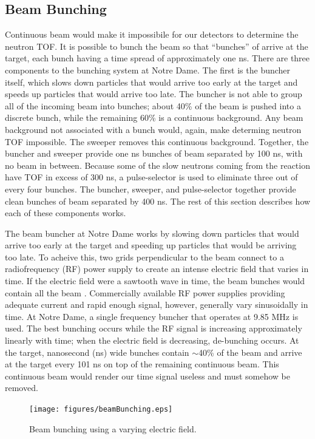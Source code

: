 \subsection{Beam Bunching}

Continuous beam would make it impossibile for our detectors to determine the neutron TOF.  It is possible to bunch the beam so that ``bunches'' of  arrive at the target, each bunch having a time spread of approximately one ns. There are three components to the bunching system at Notre Dame.  The first is the buncher itself, which slows down particles that would arrive too early at the target and speeds up particles that would arrive too late.  The buncher is not able to group all of the incoming beam into bunches; about 40\% of the beam is pushed into a discrete bunch, while the remaining 60\% is a continuous background.  Any beam background not associated with a bunch would, again, make determing neutron TOF impossible.  The sweeper removes this continuous background.  Together, the buncher and sweeper provide one ns bunches of beam separated by 100 ns, with no beam in between.  Because some of the slow neutrons coming from the reaction have TOF in excess of 300 ns, a pulse-selector is used to eliminate three out of every four bunches.  The buncher, sweeper, and pulse-selector together provide clean bunches of beam separated by 400 ns.  The rest of this section describes how each of these components works.

The beam buncher at Notre Dame works by slowing down particles that would arrive too early at the target and speeding up particles that would be arriving too late.  To acheive this, two grids perpendicular to the beam connect to a radiofrequency (RF) power supply to create an intense electric field that varies in time.  If the electric field were a sawtooth wave in time, the beam bunches would contain all the beam \cite{LynchBunching}.  Commercially available RF power supplies providing adequate current and rapid enough signal, however, generally vary sinusoidally in time.  At Notre Dame, a single frequency buncher that operates at 9.85 MHz is used.  The best bunching occurs while the RF signal is increasing approximately linearly with time; when the electric field is decreasing, de-bunching occurs.  At the target, nanosecond (ns) wide bunches contain $\sim$40\% of the beam and arrive at the target every 101 ns on top of the remaining continuous beam.  This continuous beam would render our time signal useless and must somehow be removed.

\begin{figure}[htp]
\centering
\texttt{[image: figures/beamBunching.eps]}
\label{fig:bunching}
\caption{Beam bunching using a varying electric field.}
\end{figure}

